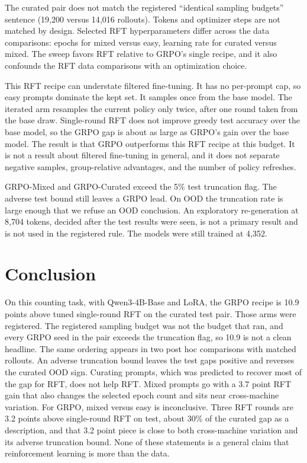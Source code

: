 The curated pair does not match the registered ``identical sampling budgets'' sentence (19{,}200 versus 14{,}016 rollouts). Tokens and optimizer steps are not matched by design. Selected RFT hyperparameters differ across the data comparisons: epochs for mixed versus easy, learning rate for curated versus mixed. The sweep favors RFT relative to GRPO's single recipe, and it also confounds the RFT data comparisons with an optimization choice.

This RFT recipe can understate filtered fine-tuning. It has no per-prompt cap, so easy prompts dominate the kept set. It samples once from the base model. The iterated arm resamples the current policy only twice, after one round taken from the base draw. Single-round RFT does not improve greedy test accuracy over the base model, so the GRPO gap is about as large as GRPO's gain over the base model. The result is that GRPO outperforms this RFT recipe at this budget. It is not a result about filtered fine-tuning in general, and it does not separate negative samples, group-relative advantages, and the number of policy refreshes.

GRPO-Mixed and GRPO-Curated exceed the 5\% test truncation flag. The adverse test bound still leaves a GRPO lead. On OOD the truncation rate is large enough that we refuse an OOD conclusion. An exploratory re-generation at 8{,}704 tokens, decided after the test results were seen, is not a primary result and is not used in the registered rule. The models were still trained at 4{,}352.

\section{Conclusion}
\label{sec:conclusion}

On this counting task, with Qwen3-4B-Base and LoRA, the GRPO recipe is 10.9 points above tuned single-round RFT on the curated test pair. Those arms were registered. The registered sampling budget was not the budget that ran, and every GRPO seed in the pair exceeds the truncation flag, so 10.9 is not a clean headline. The same ordering appears in two post hoc comparisons with matched rollouts. An adverse truncation bound leaves the test gaps positive and reverses the curated OOD sign. Curating prompts, which was predicted to recover most of the gap for RFT, does not help RFT. Mixed prompts go with a 3.7 point RFT gain that also changes the selected epoch count and sits near cross-machine variation. For GRPO, mixed versus easy is inconclusive. Three RFT rounds are 3.2 points above single-round RFT on test, about 30\% of the curated gap as a description, and that 3.2 point piece is close to both cross-machine variation and its adverse truncation bound. None of these statements is a general claim that reinforcement learning is more than the data.

